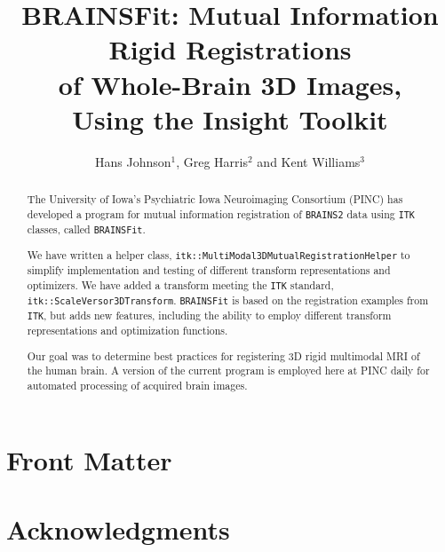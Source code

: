 \documentclass{InsightArticle}
\title{BRAINSFit: Mutual Information Rigid Registrations\\
    of Whole-Brain 3D Images,\\
    Using the Insight Toolkit}
\author{Hans Johnson$^{1}$, Greg Harris$^{2}$ and Kent Williams$^{3}$}
\begin{document}
\ifpdf
\else
\fi
\newcommand{\bcode}{\texttt}
\newcommand{\bbigcommand}[1]{\texttt{\large{\framebox{#1}}}}
\newcommand{\brainstwoprog}{\bcode{BRAINS2}}
\newcommand{\brainsprog}{\bcode{BRAINS}}
\newcommand{\miregprog}{\bcode{BRAINSFit}}
\newcommand{\smallimagescale}{0.66}

\maketitle


\ifhtml
\chapter*{Front Matter\label{front}}
\fi


\begin{abstract}
\noindent
The University of Iowa's Psychiatric Iowa Neuroimaging Consortium
(PINC) has developed a program for mutual information registration of
\brainstwoprog{} \cite{magnotta:brains2} data using \bcode{ITK}
\cite{ibanez:ITKSoftwareGuide14} classes, called \miregprog{}.  \par
We have written a helper class,
\bcode{itk::MultiModal3DMutualRegistrationHelper} to simplify
implementation and testing of different transform representations and
optimizers.  We have added a transform meeting the \bcode{ITK}
standard, \bcode{itk::ScaleVersor3DTransform}.  \miregprog{} is based
on the registration examples from \bcode{ITK}, but adds new features,
including the ability to employ different transform representations
and optimization functions.  \par Our goal was to determine best
practices for registering 3D rigid multimodal MRI of the human
brain. A version of the current program is employed here at PINC daily
for automated processing of acquired brain images.
\end{abstract}
\chapter*{Acknowledgments} 
\label{sec:acknowledgementsknow}
\end{document}
